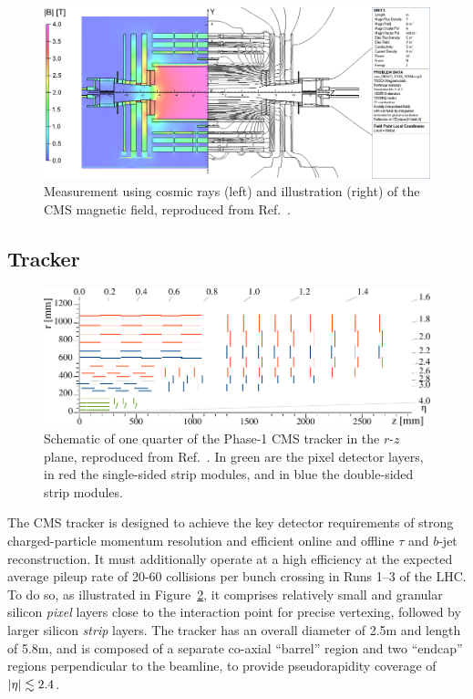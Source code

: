 \begin{figure}[ht]
    \centering
    \includegraphics[width=\textwidth]{figures/02-CMS/cms/components/magnetic_field}
    \caption{Measurement using cosmic rays (left) and illustration (right) of the CMS magnetic field, reproduced from Ref.~\cite{CMS:2009moq}.}
    \label{fig:02_cms_magnetic_field}
\end{figure}

\subsection{Tracker}
\label{sec:02_cms_tracker}

\begin{figure}[ht]
    \centering
    \includegraphics[width=\textwidth]{figures/02-CMS/cms/components/Phase1_Tracker_1Quarter.pdf}
    \caption{Schematic of one quarter of the Phase-1 CMS tracker in the $r$-$z$ plane, reproduced from Ref.~\cite{CMS:2017lum}.
    In green are the pixel detector layers, in red the single-sided strip modules, and in blue the double-sided strip modules.}
    \label{fig:02_cms_tracker}
\end{figure}

The CMS tracker is designed to achieve the key detector requirements of strong charged-particle momentum resolution and efficient online and offline $\tau$ and $b$-jet reconstruction.
It must additionally operate at a high efficiency at the expected average pileup rate of 20-60 collisions per bunch crossing in Runs 1--3 of the LHC.
To do so, as illustrated in Figure~\ref{fig:02_cms_tracker}, it comprises relatively small and granular silicon \textit{pixel} layers close to the interaction point for precise vertexing, followed by larger silicon \textit{strip} layers.
The tracker has an overall diameter of 2.5m and length of 5.8m, and is composed of a separate co-axial ``barrel'' region and two ``endcap'' regions perpendicular to the beamline, to provide pseudorapidity coverage of $\left\lvert \eta \right\rvert \lesssim 2.4$.

